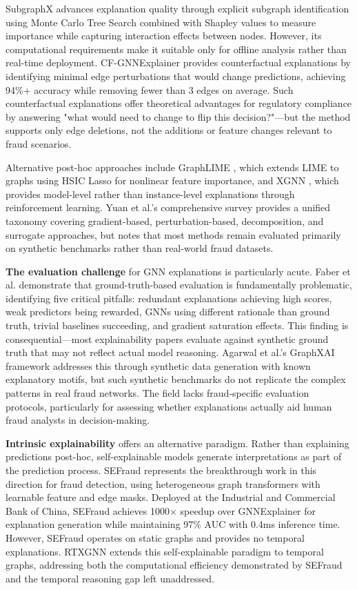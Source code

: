 SubgraphX \citep{yuan2021subgraphx} advances explanation quality through explicit subgraph identification using Monte Carlo Tree Search combined with Shapley values to measure importance while capturing interaction effects between nodes. However, its computational requirements make it suitable only for offline analysis rather than real-time deployment. CF-GNNExplainer \citep{lucic2022cfgnnexplainer} provides counterfactual explanations by identifying minimal edge perturbations that would change predictions, achieving 94\%+ accuracy while removing fewer than 3 edges on average. Such counterfactual explanations offer theoretical advantages for regulatory compliance by answering "what would need to change to flip this decision?"—but the method supports only edge deletions, not the additions or feature changes relevant to fraud scenarios.

Alternative post-hoc approaches include GraphLIME \citep{huang2022graphlime}, which extends LIME to graphs using HSIC Lasso for nonlinear feature importance, and XGNN \citep{yuan2020xgnn}, which provides model-level rather than instance-level explanations through reinforcement learning. Yuan et al.'s comprehensive survey \citep{yuan2023explainability_survey} provides a unified taxonomy covering gradient-based, perturbation-based, decomposition, and surrogate approaches, but notes that most methods remain evaluated primarily on synthetic benchmarks rather than real-world fraud datasets.

\textbf{The evaluation challenge} for GNN explanations is particularly acute. Faber et al. \citep{faber2021groundtruth} demonstrate that ground-truth-based evaluation is fundamentally problematic, identifying five critical pitfalls: redundant explanations achieving high scores, weak predictors being rewarded, GNNs using different rationale than ground truth, trivial baselines succeeding, and gradient saturation effects. This finding is consequential—most explainability papers evaluate against synthetic ground truth that may not reflect actual model reasoning. Agarwal et al.'s GraphXAI framework \citep{agarwal2023graphxai} addresses this through synthetic data generation with known explanatory motifs, but such synthetic benchmarks do not replicate the complex patterns in real fraud networks. The field lacks fraud-specific evaluation protocols, particularly for assessing whether explanations actually aid human fraud analysts in decision-making.

\textbf{Intrinsic explainability} offers an alternative paradigm. Rather than explaining predictions post-hoc, self-explainable models generate interpretations as part of the prediction process. SEFraud \citep{li2024sefraud} represents the breakthrough work in this direction for fraud detection, using heterogeneous graph transformers with learnable feature and edge masks. Deployed at the Industrial and Commercial Bank of China, SEFraud achieves 1000× speedup over GNNExplainer for explanation generation while maintaining 97\% AUC with 0.4ms inference time. However, SEFraud operates on static graphs and provides no temporal explanations. RTXGNN extends this self-explainable paradigm to temporal graphs, addressing both the computational efficiency demonstrated by SEFraud and the temporal reasoning gap left unaddressed.


